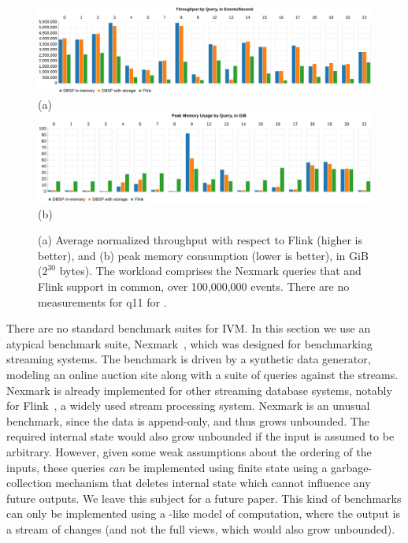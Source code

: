 \begin{figure}
  \includegraphics[width=.95\textwidth]{graph/throughput} \hspace{-3ex}
  (a) \\
  \includegraphics[width=.95\textwidth]{graph/memory} \hspace{-3ex}
  (b) \\
  \caption{(a) Average normalized throughput with respect to Flink
    (higher is better), and (b) peak memory consumption (lower is
    better), in GiB (\(2^{30}\) bytes).  The workload comprises the
    Nexmark queries that \dbsp and Flink support in common, over
    100,000,000 events.  There are no measurements for q11 for
    \dbsp.\label{fig:macrobenchmark}}
\end{figure}

There are no standard benchmark suites for IVM.  In this section we
use an atypical benchmark suite, Nexmark~\cite{tucker2008nexmark},
which was designed for benchmarking streaming systems.  The benchmark
is driven by a synthetic data generator, modeling an online
auction site along with a suite of queries against the streams.
Nexmark is already implemented for other streaming database systems,
notably for Flink~\cite{carbone-ieee15,nexmark-flink}, a widely used
stream processing system.  Nexmark is an unusual benchmark, since the
data is append-only, and thus grows unbounded.  The required internal
state would also grow unbounded if the input is assumed to be
arbitrary.  However, given some weak assumptions about the ordering of
the inputs, these queries \emph{can} be implemented using finite state
using a garbage-collection mechanism that deletes internal state which
cannot influence any future outputs.  We leave this subject for a
future paper.  This kind of benchmarks can only be implemented using a
\dbsp-like model of computation, where the output is a stream of
changes (and not the full views, which would also grow unbounded).

